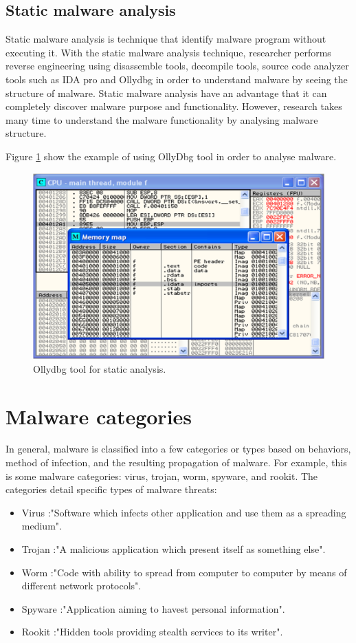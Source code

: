 \subsection{Static malware analysis}
Static malware analysis is technique that identify malware program without executing it. With the static malware analysis technique, researcher performs reverse engineering using disassemble tools, decompile tools, source code analyzer tools such as IDA pro and Ollydbg in order to understand malware by seeing the structure of malware. Static malware analysis have an advantage that it can completely discover malware purpose and functionality. However, research takes many time to understand the malware functionality by analysing malware structure.

Figure \ref{fig:OllyDbg} show the example of using OllyDbg tool in order to analyse malware. 
\begin{figure}[h!]
\centering
\includegraphics[width=1\textwidth]{graph/OllyDbg.png}
\caption{Ollydbg tool for static analysis.}
\label{fig:OllyDbg}
\end{figure}
\section{Malware categories}

In general, malware is classified into a few categories or types based on behaviors, method of infection, and the resulting propagation of malware. For example, this is some malware categories: virus, trojan, worm, spyware, and rookit. The categories detail specific types of malware threats:

\begin{itemize}
\item Virus :"Software which infects other application and use them as a spreading medium"\cite{BlackHat}.
\item Trojan :"A malicious application which present itself as something else"\cite{BlackHat}.
\item Worm :"Code with ability to spread from computer to computer by means of different network protocols"\cite{BlackHat}.
\item Spyware :"Application aiming to havest personal information"\cite{BlackHat}.
\item Rookit :"Hidden tools providing stealth services to its writer"\cite{BlackHat}.
\end{itemize}

